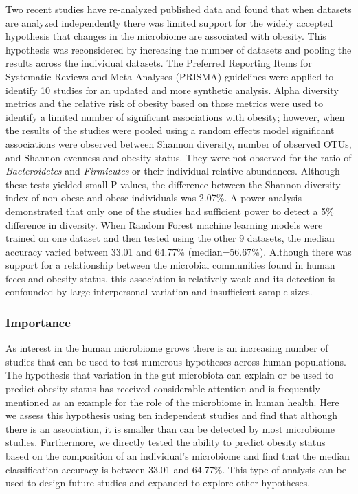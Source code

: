 \documentclass[12pt,]{article}
\begin{document}
Two recent studies have re-analyzed published data and found that when
datasets are analyzed independently there was limited support for the
widely accepted hypothesis that changes in the microbiome are associated
with obesity. This hypothesis was reconsidered by increasing the number
of datasets and pooling the results across the individual datasets. The
Preferred Reporting Items for Systematic Reviews and Meta-Analyses
(PRISMA) guidelines were applied to identify 10 studies for an updated
and more synthetic analysis. Alpha diversity metrics and the relative
risk of obesity based on those metrics were used to identify a limited
number of significant associations with obesity; however, when the
results of the studies were pooled using a random effects model
significant associations were observed between Shannon diversity, number
of observed OTUs, and Shannon evenness and obesity status. They were not
observed for the ratio of \emph{Bacteroidetes} and \emph{Firmicutes} or
their individual relative abundances. Although these tests yielded small
P-values, the difference between the Shannon diversity index of
non-obese and obese individuals was 2.07\%. A power analysis
demonstrated that only one of the studies had sufficient power to detect
a 5\% difference in diversity. When Random Forest machine learning
models were trained on one dataset and then tested using the other 9
datasets, the median accuracy varied between 33.01 and 64.77\%
(median=56.67\%). Although there was support for a relationship between
the microbial communities found in human feces and obesity status, this
association is relatively weak and its detection is confounded by large
interpersonal variation and insufficient sample sizes.

\subsubsection{Importance}\label{importance}

As interest in the human microbiome grows there is an increasing number
of studies that can be used to test numerous hypotheses across human
populations. The hypothesis that variation in the gut microbiota can
explain or be used to predict obesity status has received considerable
attention and is frequently mentioned as an example for the role of the
microbiome in human health. Here we assess this hypothesis using ten
independent studies and find that although there is an association, it
is smaller than can be detected by most microbiome studies. Furthermore,
we directly tested the ability to predict obesity status based on the
composition of an individual's microbiome and find that the median
classification accuracy is between 33.01 and 64.77\%. This type of
analysis can be used to design future studies and expanded to explore
other hypotheses.
\end{document}
